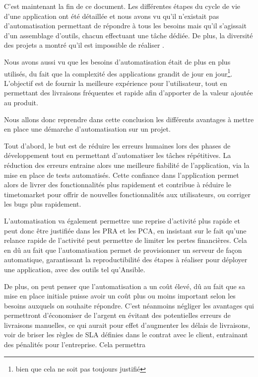 C'est maintenant la fin de ce document. Les différentes étapes du cycle de vie d'une application ont été détaillée et nous avons vu qu'il n'existait pas d'automatisation  permettant de répondre à tous les besoins mais qu'il s'agissait d'un assemblage d'outils, chacun effectuant une tâche dédiée. De plus, la diversité des projets a montré qu'il est impossible de réaliser .

Nous avons aussi vu que les besoins d'automatisation était de plus en plus utilisés, du fait que la complexité des applications grandit de jour en jour\footnote{bien que cela ne soit pas toujours justifié}. L'objectif est de fournir la meilleure expérience pour l'utilisateur, tout en permettant des livraisons fréquentes et rapide afin d'apporter de la valeur ajoutée au produit.


Nous allons donc reprendre dans cette conclusion les différents avantages à mettre en place une démarche d'automatisation sur un projet.

Tout d'abord, le but est de réduire les erreurs humaines lors des phases de développement tout en permettant d'automatiser les tâches répétitives. La réduction des erreurs entraine alors une meilleure fiabilité de l'application, via la mise en place de tests automatisés. Cette confiance dans l'application permet alors de livrer des fonctionnalités plus rapidement et contribue à réduire le \gls{timetomarket} pour offrir de nouvelles fonctionnalités aux utilisateurs, ou corriger les bugs plus rapidement.

L'automatisation va également permettre une reprise d'activité plus rapide et peut donc être justifiée dans les \gls{PRA} et les \gls{PCA}, en insistant sur le fait qu'une relance rapide de l'activité peut permettre de limiter les pertes financières. Cela en dû au fait que l'automatisation permet de provisionner un serveur de façon automatique, garantissant la reproductibilité des étapes à réaliser pour déployer une application, avec des outils tel qu'Ansible.

De plus, on peut penser que l'automatisation a un coût élevé, dû au fait que sa mise en place initiale puisse avoir un coût plus ou moins important selon les besoins auxquels on souhaite répondre. C'est néanmoins négliger les avantages qui permettront d'économiser de l'argent en évitant des potentielles erreurs de livraisons manuelles, ce qui aurait pour effet d'augmenter les délais de livraisons, voir de briser les règles de \gls{SLA} définies dans le contrat avec le client, entrainant des pénalités pour l'entreprise. Cela permettra 

